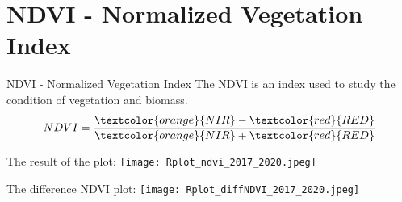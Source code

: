 \documentclass{beamer}
\begin{document}
\section{NDVI - Normalized Vegetation Index}
\begin{frame}{NDVI - Normalized Vegetation Index}
The NDVI is an index used to study the condition of vegetation and biomass. 
\bigskip
\begin{equation}
    NDVI = \frac{\textcolor{orange}{NIR} - \textcolor{red}{RED}}{\textcolor{orange}{NIR} + \textcolor{red}{RED}}
\end{equation}
  \scriptsize{}
    
\end{frame}

\begin{frame}%
    The result of the plot: 
    \texttt{[image: Rplot\_ndvi\_2017\_2020.jpeg]}\\
\end{frame}

\begin{frame}
The difference NDVI plot:
\scriptsize{}
    \centering
    \texttt{[image: Rplot\_diffNDVI\_2017\_2020.jpeg]}\\
\end{frame}
\end{document}
